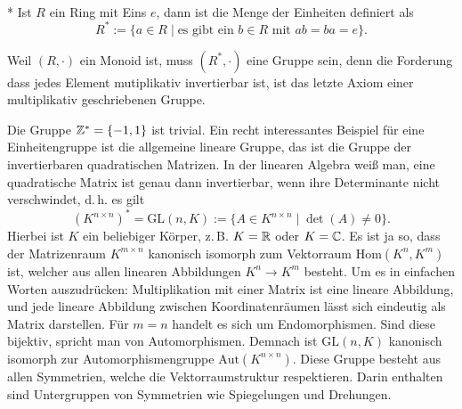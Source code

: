 \begin{Definition}[Einheitengruppe]\mbox{}\\*
Ist $R$ ein Ring mit Eins $e$, dann ist die Menge der Einheiten definiert als
\[R^* := \{a\in R\mid \text{es gibt ein $b\in R$ mit $ab=ba=e$}\}.\]
\end{Definition}
Weil $(R,\cdot)$ ein Monoid ist, muss $(R^*,\cdot)$ eine Gruppe sein,
denn die Forderung dass jedes Element mutiplikativ invertierbar ist,
ist das letzte Axiom einer multiplikativ geschriebenen Gruppe.

Die Gruppe $\mathbb Z^* = \{-1,1\}$ ist trivial.
Ein recht interessantes Beispiel für eine Einheitengruppe ist die
allgemeine lineare Gruppe, das ist die Gruppe der invertierbaren
quadratischen Matrizen. In der linearen Algebra weiß man, eine
quadratische Matrix ist genau dann invertierbar, wenn ihre Determinante
nicht verschwindet, d.\,h. es gilt%
\[(K^{n\times n})^* = \mathrm{GL}(n,K) :=
\{A\in K^{n\times n}\mid \det(A)\ne 0\}.\]
Hierbei ist $K$ ein beliebiger Körper, z.\,B. $K=\mathbb R$ oder $K=\mathbb C$.
Es ist ja so, dass der Matrizenraum $K^{m\times n}$ kanonisch
isomorph zum Vektorraum $\mathrm{Hom}(K^n,K^m)$ ist, welcher aus
allen linearen Abbildungen $K^n\to K^m$ besteht. Um es in einfachen
Worten auszudrücken: Multiplikation mit einer Matrix ist eine
lineare Abbildung, und jede lineare Abbildung zwischen Koordinatenräumen
lässt sich eindeutig als Matrix darstellen. Für $m=n$ handelt
es sich um Endomorphismen. Sind diese bijektiv, spricht man von
Automorphismen. Demnach ist $\mathrm{GL}(n,K)$ kanonisch isomorph
zur Automorphismengruppe $\mathrm{Aut}(K^{n\times n})$. Diese Gruppe
besteht aus allen Symmetrien, welche die Vektorraumstruktur
respektieren. Darin enthalten sind Untergruppen von Symmetrien wie
Spiegelungen und Drehungen.





